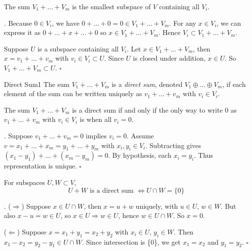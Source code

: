 \documentclass[11pt]{article}
\renewenvironment{proof}[1][\proofname]{\par\noindent\textit{#1.} }{\hfill$\square$\par}
\begin{document}
\begin{theorem}
The sum $V_1 + \dots + V_m$ is the smallest subspace of $V$ containing all $V_i$.
\end{theorem}
\begin{proof}
Because $0 \in V_i$, we have $0 + \dots + 0 = 0 \in V_1 + \dots + V_m$. For any $x \in V_i$, we can express it as $0 + \dots + x + \dots + 0$ so $x \in V_1 + \dots + V_m$. Hence $V_i \subset V_1 + \dots + V_m$.

Suppose $U$ is a subspace containing all $V_i$. Let $x \in V_1 + \dots + V_m$, then $x = v_1 + \dots + v_m$ with $v_i \in V_i \subset U$. Since $U$ is closed under addition, $x \in U$. So $V_1 + \dots + V_m \subset U$.
\end{proof}

\begin{definition}{Direct Sum}{1}
The sum $V_1 + \dots + V_m$ is a \textit{direct sum}, denoted $V_1 \oplus \dots \oplus V_m$, if each element of the sum can be written uniquely as $v_1 + \dots + v_m$ with $v_i \in V_i$.
\end{definition}

\begin{theorem}
The sum $V_1 + \dots + V_m$ is a direct sum if and only if the only way to write $0$ as $v_1 + \dots + v_m$ with $v_i \in V_i$ is when all $v_i = 0$.
\end{theorem}
\begin{proof}
Suppose $v_1 + \dots + v_m = 0$ implies $v_i = 0$. Assume $v = x_1 + \dots + x_m = y_1 + \dots + y_m$ with $x_i, y_i \in V_i$. Subtracting gives $(x_1 - y_1) + \dots + (x_m - y_m) = 0$. By hypothesis, each $x_i = y_i$. Thus representation is unique.
\end{proof}

\begin{theorem}
For subspaces $U, W \subset V$,
\[
  U + W \text{ is a direct sum } \Leftrightarrow U \cap W = \{0\}
\]
\end{theorem}
\begin{proof}
(\( \Rightarrow \)) Suppose $x \in U \cap W$, then $x = u + w$ uniquely, with $u \in U$, $w \in W$. But also $x - u = w \in U$, so $x \in U \Rightarrow w \in U$, hence $w \in U \cap W$. So $x = 0$.

(\( \Leftarrow \)) Suppose $x = x_1 + y_1 = x_2 + y_2$ with $x_i \in U$, $y_i \in W$. Then $x_1 - x_2 = y_2 - y_1 \in U \cap W$. Since intersection is \{0\}, we get $x_1 = x_2$ and $y_1 = y_2$.
\end{proof}
\end{document}
